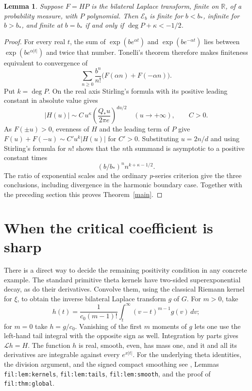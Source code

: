 \documentclass[11pt]{article}
\newtheorem{lemma}[theorem]{Lemma}
\newcommand{\R}{\mathbb R}\newcommand{\C}{\mathbb C}
\newcommand{\E}{\mathcal E}\newcommand{\F}{\mathcal F}
\begin{document}
\begin{lemma}\label{sumtest}
Suppose $F=HP$ is the bilateral Laplace transform, finite on $\R$, of a probability measure, with $P$ polynomial. Then $\E_b$ is finite for $b<b_*$, infinite for $b>b_*$, and finite at $b=b_*$ if and only if $\deg P+\kappa<-1/2$.
\end{lemma}
\begin{proof}
For every real $t$, the sum of $\exp(be^{\alpha t})$ and $\exp(be^{-\alpha t})$ lies between $\exp(be^{\alpha|t|})$ and twice that number. Tonelli's theorem therefore makes finiteness equivalent to convergence of
\[
 \sum_{n\ge0}\frac{b^n}{n!}\bigl(F(\alpha n)+F(-\alpha n)\bigr).
\]
Put $k=\deg P$. On the real axis Stirling's formula with its positive leading constant in absolute value gives
\[
 |H(u)|\sim C\,u^\kappa\left(\frac{Q_*u}{2\pi e}\right)^{du/2}\quad(u\to+\infty),\qquad C>0.
\]
As $F(\pm u)>0$, evenness of $H$ and the leading term of $P$ give $F(u)+F(-u)\sim C' u^k |H(u)|$ for $C'>0$. Substituting $u=2n/d$ and using Stirling's formula for $n!$ shows that the $n$th summand is asymptotic to a positive constant times
\[
  (b/b_*)^n n^{k+\kappa-1/2}.
\]
The ratio of exponential scales and the ordinary $p$-series criterion give the three conclusions, including divergence in the harmonic boundary case. Together with the preceding section this proves Theorem~\ref{main}.
\end{proof}

\section{When the critical coefficient is sharp}
There is a direct way to decide the remaining positivity condition in any concrete example. The standard primitive theta kernels have two-sided superexponential decay, as do their derivatives. Convolve them, using the classical Riemann kernel for $\xi$, to obtain the inverse bilateral Laplace transform $g$ of $G$. For $m>0$, take
\[
 h(t)=\frac{1}{c_0(m-1)!}\int_t^\infty(v-t)^{m-1}g(v)\,dv;
\]
for $m=0$ take $h=g/c_0$. Vanishing of the first $m$ moments of $g$ lets one use the left-hand tail integral with the opposite sign as well. Integration by parts gives $\mathcal Lh=H$. The function $h$ is real, smooth, even, has mass one, and it and all its derivatives are integrable against every $e^{x|t|}$. For the underlying theta identities, the division argument, and the signed compact smoothing see \cite{repo}, Lemmas \texttt{fil:lem:kernels}, \texttt{fil:lem:tails}, \texttt{fil:lem:smooth}, and the proof of \texttt{fil:thm:global}.
\end{document}
